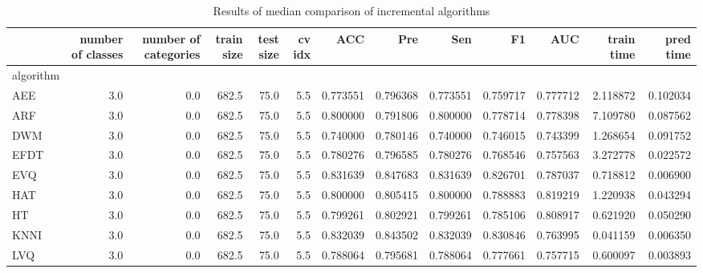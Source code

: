 \begin{table}[H]
\footnotesize
\centering
\caption{Results of median comparison of incremental algorithms}
\label{tab:Incremental comparison median}
\begin{tabular}{lrrrrrrrrrrrr}
\hline
{} &  number of classes &  number of categories &  train size &  test size &  cv idx &  ACC &  Pre &    Sen &        F1 &       AUC &  train time &  pred time \\
\hline
algorithm &                    &                       &             &            &         &           &            &           &           &           &             &            \\
AEE       &                3.0 &                   0.0 &       682.5 &       75.0 &     5.5 &  0.773551 &   0.796368 &  0.773551 &  0.759717 &  0.777712 &    2.118872 &   0.102034 \\
ARF       &                3.0 &                   0.0 &       682.5 &       75.0 &     5.5 &  0.800000 &   0.791806 &  0.800000 &  0.778714 &  0.778398 &    7.109780 &   0.087562 \\
DWM       &                3.0 &                   0.0 &       682.5 &       75.0 &     5.5 &  0.740000 &   0.780146 &  0.740000 &  0.746015 &  0.743399 &    1.268654 &   0.091752 \\
EFDT      &                3.0 &                   0.0 &       682.5 &       75.0 &     5.5 &  0.780276 &   0.796585 &  0.780276 &  0.768546 &  0.757563 &    3.272778 &   0.022572 \\
EVQ       &                3.0 &                   0.0 &       682.5 &       75.0 &     5.5 &  0.831639 &   0.847683 &  0.831639 &  0.826701 &  0.787037 &    0.718812 &   0.006900 \\
HAT       &                3.0 &                   0.0 &       682.5 &       75.0 &     5.5 &  0.800000 &   0.805415 &  0.800000 &  0.788883 &  0.819219 &    1.220938 &   0.043294 \\
HT        &                3.0 &                   0.0 &       682.5 &       75.0 &     5.5 &  0.799261 &   0.802921 &  0.799261 &  0.785106 &  0.808917 &    0.621920 &   0.050290 \\
KNNI      &                3.0 &                   0.0 &       682.5 &       75.0 &     5.5 &  0.832039 &   0.843502 &  0.832039 &  0.830846 &  0.763995 &    0.041159 &   0.006350 \\
LVQ       &                3.0 &                   0.0 &       682.5 &       75.0 &     5.5 &  0.788064 &   0.795681 &  0.788064 &  0.777661 &  0.757715 &    0.600097 &   0.003893 \\

\end{tabular}
\end{table}
